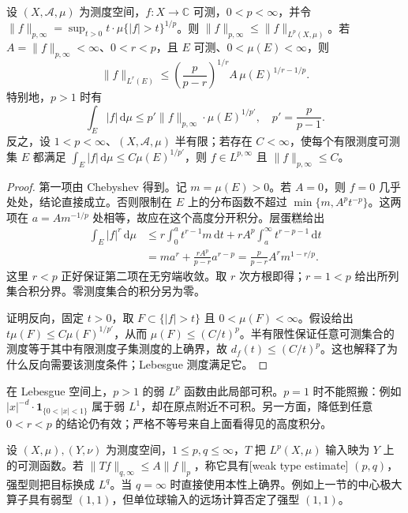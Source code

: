 \begin{proposition}[弱范数与有限集合积分]\label{b2:thm:17-weak-inclusions}
设 \((X,\mathcal A,\mu)\) 为测度空间，\(f:X\to\mathbb C\) 可测，\(0<p<\infty\)，并令 \(\|f\|_{p,\infty}=\sup_{t>0}t\cdot\mu\{|f|>t\}^{1/p}\)。则 \(\|f\|_{p,\infty}\leq\|f\|_{L^p(X,\mu)}\)。若 \(A=\|f\|_{p,\infty}<\infty\)、\(0<r<p\)，且 \(E\) 可测、\(0<\mu(E)<\infty\)，则
\[\|f\|_{L^r(E)}\leq
 \left(\frac p{p-r}\right)^{1/r}
 A\,\mu(E)^{1/r-1/p}.\]
特别地，\(p>1\) 时有
\[\int_E|f|\,\mathrm d\mu\leq p'\|f\|_{p,\infty}\cdot\mu(E)^{1/p'},
 \quad p'=\frac p{p-1}.\]
反之，设 \(1<p<\infty\)、\((X,\mathcal A,\mu)\) 半有限；若存在 \(C<\infty\)，使每个有限测度可测集 \(E\) 都满足 \(\int_E|f|\,\mathrm d\mu\leq C\mu(E)^{1/p'}\)，则 \(f\in L^{p,\infty}\) 且 \(\|f\|_{p,\infty}\leq C\)。
\end{proposition}
\begin{proof}
第一项由 Chebyshev 得到。记 \(m=\mu(E)>0\)。若 \(A=0\)，则 \(f=0\) 几乎处处，结论直接成立。否则限制在 \(E\) 上的分布函数不超过 \(\min\{m,A^pt^{-p}\}\)。这两项在 \(a=Am^{-1/p}\) 处相等，故应在这个高度分开积分。层蛋糕给出
\[
 \begin{aligned}
 \int_E|f|^r\,\mathrm d\mu
 &\leq r\int_0^a t^{r-1}m\,\mathrm dt
       +rA^p\int_a^\infty t^{r-p-1}\,\mathrm dt\\
 &=m a^r+\frac{rA^p}{p-r}a^{r-p}
  =\frac p{p-r}A^rm^{1-r/p}.
 \end{aligned}
\]
这里 \(r<p\) 正好保证第二项在无穷端收敛。取 \(r\) 次方根即得；\(r=1<p\) 给出所列集合积分界。零测度集合的积分另为零。

证明反向，固定 \(t>0\)，取 \(F\subset\{|f|>t\}\) 且 \(0<\mu(F)<\infty\)。假设给出 \(t\mu(F)\leq C\mu(F)^{1/p'}\)，从而 \(\mu(F)\leq(C/t)^p\)。半有限性保证任意可测集合的测度等于其中有限测度子集测度的上确界，故 \(d_f(t)\leq(C/t)^p\)。这也解释了为什么反向需要该测度条件；Lebesgue 测度满足它。
\end{proof}
在 Lebesgue 空间上，\(p>1\) 的弱 \(L^p\) 函数由此局部可积。\(p=1\) 时不能照搬：例如 \(|x|^{-d}\cdot\mathbf1_{\{0<|x|<1\}}\) 属于弱 \(L^1\)，却在原点附近不可积。另一方面，降低到任意 \(0<r<p\) 的结论仍有效；严格不等号来自上面看得见的高度积分。

\ProseParagraphBreak

设 \((X,\mu),(Y,\nu)\) 为测度空间，\(1\leq p,q\leq\infty\)，\(T\) 把 \(L^p(X,\mu)\) 输入映为 \(Y\) 上的可测函数。若 \(\|Tf\|_{q,\infty}\leq A\|f\|_p\)，称它具有[weak type estimate] \((p,q)\)，强型则把目标换成 \(L^q\)。当 \(q=\infty\) 时直接使用本性上确界。例如上一节的中心极大算子具有弱型 \((1,1)\)，但单位球输入的远场计算否定了强型 \((1,1)\)。

